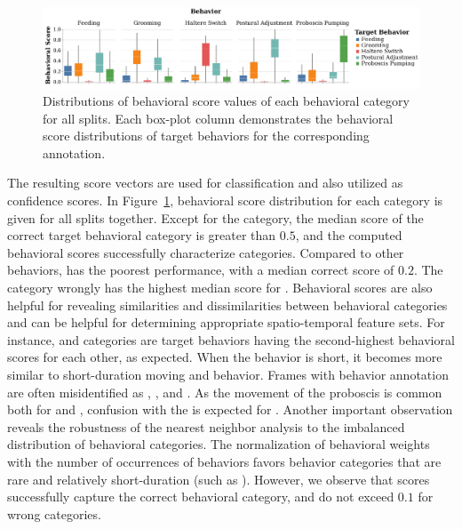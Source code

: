 \begin{figure}[htb!]
	\centering
	\includegraphics[width=\linewidth]{figures/BehavioralScoresDistributions_perBehavior.pdf}
	\caption[Distributions of behavioral score values of each behavioral category for all splits together.]{Distributions of behavioral score values of each behavioral category for all splits.
		Each box-plot column demonstrates the behavioral score distributions of target behaviors for the corresponding annotation.\label{figure:behavioral-score-distributions}}
\end{figure}

The resulting score vectors are used for classification and also utilized as confidence scores.
In Figure~\ref{figure:behavioral-score-distributions}, behavioral score distribution for each category is given for all splits together.
Except for the \Feeding category, the median score of the correct target behavioral category is greater than $0.5$, and the computed behavioral scores successfully characterize categories.
Compared to other behaviors, \Feeding has the poorest performance, with a median correct score of $0.2$.
The \PosturalAdjustment category wrongly has the highest median score for \Feeding.
Behavioral scores are also helpful for revealing similarities and dissimilarities between behavioral categories and can be helpful for determining appropriate spatio-temporal feature sets.
For instance, \Grooming and \PosturalAdjustment categories are target behaviors having the second-highest behavioral scores for each other, as expected.
When the \Grooming behavior is short, it becomes more similar to short-duration moving and \PosturalAdjustment behavior.
Frames with \Feeding behavior annotation are often misidentified as \PosturalAdjustment, \Grooming, and \ProboscisPumping.
As the movement of the proboscis is common both for \Feeding and \ProboscisPumping, confusion with the \ProboscisPumping is expected for \Feeding.
Another important observation reveals the robustness of the nearest neighbor analysis to the imbalanced distribution of behavioral categories.
The normalization of behavioral weights with the number of occurrences of behaviors favors behavior categories that are rare and relatively short-duration (such as \HaltereSwitch). However, we observe that \HaltereSwitch scores successfully capture the correct behavioral category, and do not exceed $0.1$ for wrong categories.

